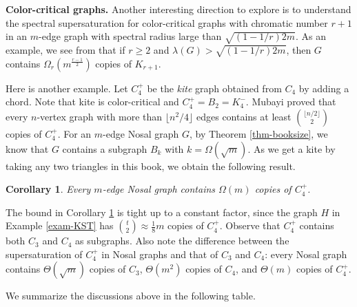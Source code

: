 \documentclass[11pt,a4paper]{article}
\newtheorem{cor}[theorem]{Corollary}
\theoremstyle{definition}
\theoremstyle{remark}
\begin{document}


\medskip

\noindent\textbf{Color-critical graphs.} 
Another interesting direction to explore is to understand the spectral supersaturation for color-critical graphs with chromatic number $r+1$ in an $m$-edge graph with 
spectral radius large than $\sqrt{(1- {1}/{r})2m}$. 
As an example, we see from 
 that if $r\ge 2$ and 
$\lambda (G)> \sqrt{(1-1/r)2m}$, then $G$ contains $\Omega_r(m^{\frac{r-1}{2}})$ copies of $K_{r+1}$. 


Here is another example. Let $C_4^+$ be the \emph{kite} graph obtained from $C_4$ by adding a chord. Note that kite is color-critical and $C_4^+ = B_2=K_4^- $. Mubayi \cite{Mubayi2010} proved that 
every $n$-vertex graph with more than $\lfloor n^2/4\rfloor$ edges contains at least ${\lfloor n/2 \rfloor \choose 2}$ copies of $C_4^+$. For an $m$-edge Nosal graph $G$, by Theorem \ref{thm-booksize}, we know that 
$G$ contains a subgraph $B_k$  
with $k= \Omega(\sqrt{m})$. As we get a kite by taking any two triangles in this book, we obtain the following result. 

\begin{cor} \label{coro-C4+}
Every $m$-edge Nosal graph contains $\Omega(m)$ copies of $C_4^+$. 
\end{cor}


The  bound in Corollary \ref{coro-C4+} is tight up to a constant factor, 
since the graph $H$ in Example \ref{exam-KST} 
has ${t \choose 2}\approx \frac{1}{8} m$ copies of $C_4^+$.   
Observe that $C_4^+$ contains both $C_3$ 
and $C_4$ as subgraphs. 
Also note the difference between the supersaturation of $C_4^+$ in Nosal graphs and that of $C_3$ and $C_4$: every Nosal graph contains $\Theta (\sqrt{m})$ copies of $C_3$, $\Theta(m^2)$ copies of $C_4$, and $\Theta(m)$ copies of $C_4^+$. 


\medskip

We summarize the discussions above in the following table. 
\end{document}
